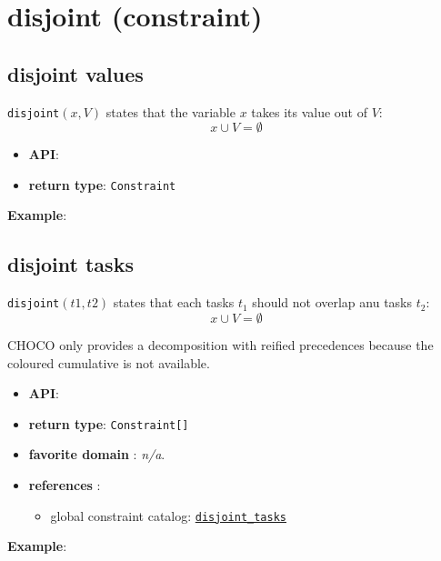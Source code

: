 \label{disjoint}
\hypertarget{disjoint}{}

\section{disjoint (constraint)}\label{disjoint:disjointconstraint}\hypertarget{disjoint:disjointconstraint}{}

\subsection{disjoint values}\label{disjoint:disjointvalues}\hypertarget{disjoint:disjointvalues}{}

\begin{notedef}
  \texttt{disjoint}$(x, V)$ states that the variable $x$ takes its value out of $V$:
 $$x \cup V = \emptyset$$  
\end{notedef}

\begin{itemize}
	\item \textbf{API}: 
	\item \textbf{return type}: \texttt{Constraint}
\end{itemize}

\textbf{Example}:


\subsection{disjoint tasks}\label{disjoint:disjointtasks}\hypertarget{disjoint:disjointtasks}{}
\begin{notedef}
  \texttt{disjoint}$(t1, t2)$ states that each tasks $t_1$ should not overlap anu tasks $t_2$:
 $$x \cup V = \emptyset$$  
\end{notedef}

CHOCO only provides a decomposition with reified precedences because the coloured cumulative is not available.

\begin{itemize}
	\item \textbf{API}: 
	\item \textbf{return type}: \texttt{Constraint[]}
	\item \textbf{favorite domain} : \emph{n/a}.
	\item \textbf{references} :
      \begin{itemize}
      \item global constraint catalog: \href{http://www.emn.fr/x-info/sdemasse/gccat/Cdisjoint_tasks.html}{\tt disjoint\_tasks}
      \end{itemize}
\end{itemize}
\textbf{Example}:

